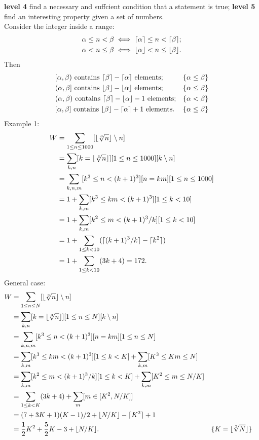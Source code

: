 \documentclass{article}
\DeclarePairedDelimiter\ceil{\lceil}{\rceil}
\DeclarePairedDelimiter\floor{\lfloor}{\rfloor}
\begin{document}
\textbf{level 4} find a necessary and suffcient condition that a statement is true;
\textbf{level 5} find an interesting property given a set of numbers.\\
Consider the integer inside a range:
\begin{align}
\alpha \le n < \beta \iff \ceil{\alpha} \le n < \ceil{\beta};\\
\alpha < n \le \beta \iff \floor{\alpha} < n \le \floor{\beta}.
\end{align}
Then
\begin{align}
&[\alpha, \beta) \text{ contains } \ceil{\beta} - \ceil{\alpha}   \text{ elements}; && \{\alpha \le \beta\} \\
&(\alpha, \beta] \text{ contains } \floor{\beta} - \floor{\alpha} \text{ elements}; && \{\alpha \le \beta\} \\
&(\alpha, \beta) \text{ contains } \ceil{\beta} - \floor{\alpha}-1 \text{ elements}; && \{\alpha < \beta\} \\
&[\alpha, \beta] \text{ contains } \floor{\beta} - \ceil{\alpha}+1 \text{ elements}. && \{\alpha \le \beta\} 
\end{align}
Example 1:
\begin{align}
W &= \sum_{1\le n \le 1000} [\floor{\sqrt[3]{n}} \setminus n] \\
  &= \sum_{k,n} [k = \floor{\sqrt[3]{n}}] [1 \le n \le 1000] [k \setminus n] \\
  &= \sum_{k,n,m} [k^3 \le n < (k+1)^3] [n = km] [1 \le n \le 1000] \\
  &= 1 + \sum_{k,m} [k^3 \le km < (k+1)^3] [1 \le k < 10]\\
  &= 1 + \sum_{k,m} [k^2 \le m < (k+1)^3/k] [1 \le k < 10]\\
  &= 1 + \sum_{1\le k < 10} (\ceil{(k+1)^3/k} - \ceil{k^2})\\
  &= 1 + \sum_{1\le k < 10} (3k+4) = 172.
\end{align}
General case:
\begin{align}
W &= \sum_{1\le n \le N} [\floor{\sqrt[3]{n}} \setminus n] \\
  &= \sum_{k,n} [k = \floor{\sqrt[3]{n}}] [1 \le n \le N] [k \setminus n] \\
  &= \sum_{k,n,m} [k^3 \le n < (k+1)^3] [n = km] [1 \le n \le N] \\
  &= \sum_{k,m} [k^3 \le km < (k+1)^3] [1 \le k < K] + \sum_{k,m} [K^3 \le Km \le N] \\
  &= \sum_{k,m} [k^2 \le m < (k+1)^3/k] [1 \le k < K] + \sum_{k,m} [K^2 \le m \le N/K] \\
  &= \sum_{1 \le k < K} (3k+4) + \sum_{m} [m \in [K^2, N/K]]\\
  &= (7+3K+1)(K-1)/2 + \floor{N/K} - \ceil{K^2} + 1\\
  &= \frac{1}{2}K^2 + \frac{5}{2}K -3 + \floor{N/K}. &&\{K=\floor{\sqrt[3]{N}}\}
\end{align}
\end{document}

